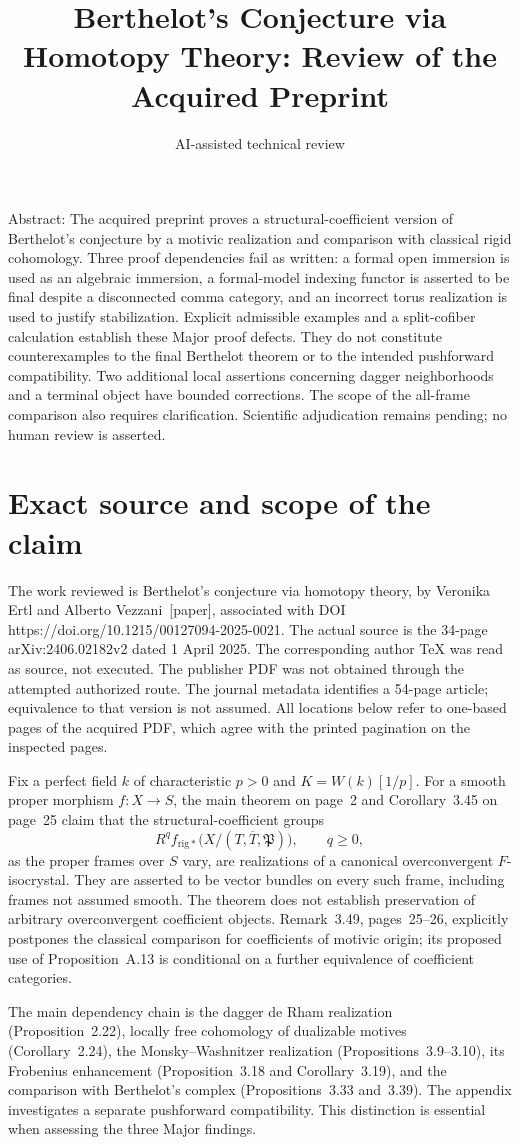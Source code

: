 \documentclass[10pt]{article}
\title{Berthelot’s Conjecture via Homotopy Theory:
Review of the Acquired Preprint}
\author{AI-assisted technical review}
\date{}
\begin{document}
\maketitle
Abstract: The acquired preprint proves a structural-coefficient version of Berthelot’s conjecture by a motivic realization and comparison with classical rigid cohomology. Three proof dependencies fail as written: a formal open immersion is used as an algebraic immersion, a formal-model indexing functor is asserted to be final despite a disconnected comma category, and an incorrect torus realization is used to justify stabilization. Explicit admissible examples and a split-cofiber calculation establish these Major proof defects. They do not constitute counterexamples to the final Berthelot theorem or to the intended pushforward compatibility. Two additional local assertions concerning dagger neighborhoods and a terminal object have bounded corrections. The scope of the all-frame comparison also requires clarification. Scientific adjudication remains pending; no human review is asserted.\par
\section*{Exact source and scope of the claim}
The work reviewed is Berthelot’s conjecture via homotopy theory, by Veronika Ertl and Alberto Vezzani [paper], associated with DOI https://doi.org/10.1215/00127094-2025-0021. The actual source is the 34-page arXiv:2406.02182v2 dated 1 April 2025. The corresponding author TeX was read as source, not executed. The publisher PDF was not obtained through the attempted authorized route. The journal metadata identifies a 54-page article; equivalence to that version is not assumed. All locations below refer to one-based pages of the acquired PDF, which agree with the printed pagination on the inspected pages.\par
Fix a perfect field \(k\) of characteristic \(p>0\) and \(K=W(k)[1/p]\). For a smooth proper morphism \(f:X\to S\), the main theorem on page 2 and Corollary 3.45 on page 25 claim that the structural-coefficient groups \[R^q f_{\mathrm{rig}*}\bigl(X/(T,\overline T,\mathfrak P)\bigr),
 \qquad q\geq0,\] as the proper frames over \(S\) vary, are realizations of a canonical overconvergent \(F\)-isocrystal. They are asserted to be vector bundles on every such frame, including frames not assumed smooth. The theorem does not establish preservation of arbitrary overconvergent coefficient objects. Remark 3.49, pages 25–26, explicitly postpones the classical comparison for coefficients of motivic origin; its proposed use of Proposition A.13 is conditional on a further equivalence of coefficient categories.\par
The main dependency chain is the dagger de Rham realization (Proposition 2.22), locally free cohomology of dualizable motives (Corollary 2.24), the Monsky–Washnitzer realization (Propositions 3.9–3.10), its Frobenius enhancement (Proposition 3.18 and Corollary 3.19), and the comparison with Berthelot’s complex (Propositions 3.33 and 3.39). The appendix investigates a separate pushforward compatibility. This distinction is essential when assessing the three Major findings.\par
\end{document}

